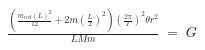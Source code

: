 \documentclass[preview]{standalone}
\begin{document}
\begin{align*}
\frac{(\frac{m_{rod}(L)^2}{12}+2m(\frac{L}{2})^2)(\frac{2\pi}{T})^2\theta r^2}{LMm} \;=\; G
\end{align*}
\end{document}
